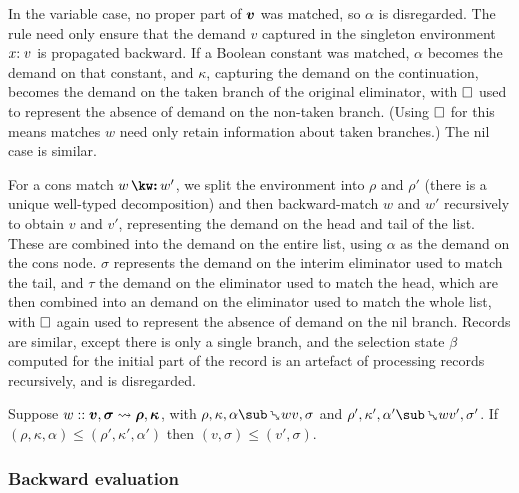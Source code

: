 In the variable case, no proper part of $\bm{v}$ was matched, so $\alpha$ is disregarded. The rule need only ensure that the demand $v$ captured in the singleton environment $x{:}\;v$ is propagated backward. If a Boolean constant was matched, $\alpha$ becomes the demand on that constant, and $\kappa$, capturing the demand on the continuation, becomes the demand on the taken branch of the original eliminator, with $\square$ used to represent the absence of demand on the non-taken branch. (Using $\square$ for this means matches $w$ need only retain information about taken branches.) The nil case is similar.

For a cons match $\matchCons{w}{w'}$, we split the environment into $\rho$ and $\rho'$ (there is a unique well-typed decomposition) and then backward-match $w$ and $w'$ recursively to obtain $v$ and $v'$, representing the demand on the head and tail of the list. These are combined into the demand on the entire list, using $\alpha$ as the demand on the cons node. $\sigma$ represents the demand on the interim eliminator used to match the tail, and $\tau$ the demand on the eliminator used to match the head, which are then combined into an demand on the eliminator used to match the whole list, with $\square$ again used to represent the absence of demand on the nil branch. Records are similar, except there is only a single branch, and the selection state $\beta$ computed for the initial part of the record is an artefact of processing records recursively, and is disregarded.

\begin{lemma}
   Suppose $w :: \bm{v}, \bm{\sigma} \rightsquigarrow \bm{\rho}, \bm{\kappa}$, with $\rho, \kappa, \alpha \matchBwdR{w} v, \sigma$ and $\rho', \kappa', \alpha' \matchBwdR{w} v', \sigma'$. If $(\rho, \kappa, \alpha) \leq (\rho', \kappa', \alpha')$ then $(v, \sigma) \leq (v', \sigma)$.
\end{lemma}

\subsubsection{Backward evaluation}
\label{sec:data-dependencies:analyses:bwd:eval}

